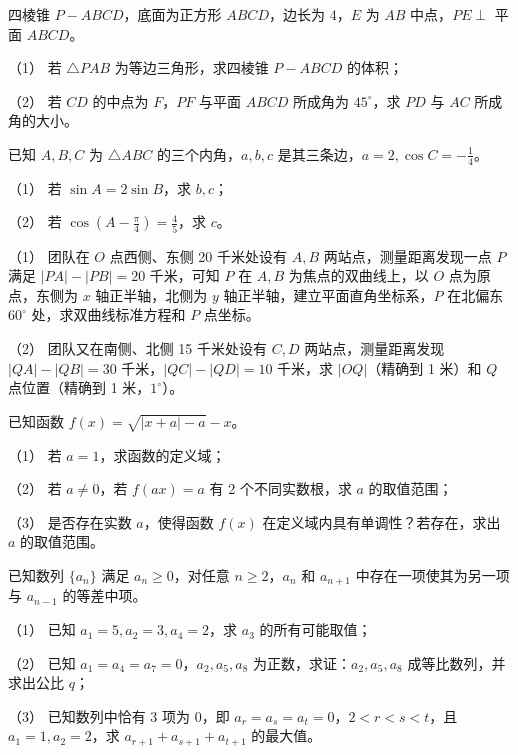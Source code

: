 \Needspace{0.4\textheight}
\begin{question}
四棱锥 $P-ABCD$，底面为正方形 $ABCD$，边长为 4，$E$ 为 $AB$ 中点，$PE\perp$ 平面 $ABCD$。

（1） 若 $\triangle PAB$ 为等边三角形，求四棱锥 $P-ABCD$ 的体积；

（2） 若 $CD$ 的中点为 $F$，$PF$ 与平面 $ABCD$ 所成角为 $45^\circ$，求 $PD$ 与 $AC$ 所成角的大小。
\nopagebreak[4]
\begin{center}\end{center}
\nopagebreak[4]
\end{question}
\begin{question}
已知 $A,B,C$ 为 $\triangle ABC$ 的三个内角，$a,b,c$ 是其三条边，$a=2,\cos C=-\frac14$。

（1） 若 $\sin A=2\sin B$，求 $b,c$；

（2） 若 $\cos(A-\frac\pi4)=\frac45$，求 $c$。
\end{question}
\begin{question}

（1） 团队在 $O$ 点西侧、东侧 20 千米处设有 $A,B$ 两站点，测量距离发现一点 $P$ 满足 $|PA|-|PB|=20$ 千米，可知 $P$ 在 $A,B$ 为焦点的双曲线上，以 $O$ 点为原点，东侧为 $x$ 轴正半轴，北侧为 $y$ 轴正半轴，建立平面直角坐标系，$P$ 在北偏东 $60^\circ$ 处，求双曲线标准方程和 $P$ 点坐标。

（2） 团队又在南侧、北侧 15 千米处设有 $C,D$ 两站点，测量距离发现 $|QA|-|QB|=30$ 千米，$|QC|-|QD|=10$ 千米，求 $|OQ|$（精确到 1 米）和 $Q$ 点位置（精确到 1 米，$1^\circ$）。
\end{question}
\begin{question}
已知函数 $f(x)=\sqrt{|x+a|-a}-x$。

（1） 若 $a=1$，求函数的定义域；

（2） 若 $a\ne0$，若 $f(ax)=a$ 有 2 个不同实数根，求 $a$ 的取值范围；

（3） 是否存在实数 $a$，使得函数 $f(x)$ 在定义域内具有单调性？若存在，求出 $a$ 的取值范围。
\end{question}
\begin{question}
已知数列 $\{a_n\}$ 满足 $a_n\ge0$，对任意 $n\ge2$，$a_n$ 和 $a_{n+1}$ 中存在一项使其为另一项与 $a_{n-1}$ 的等差中项。

（1） 已知 $a_1=5,a_2=3,a_4=2$，求 $a_3$ 的所有可能取值；

（2） 已知 $a_1=a_4=a_7=0$，$a_2,a_5,a_8$ 为正数，求证：$a_2,a_5,a_8$ 成等比数列，并求出公比 $q$；

（3） 已知数列中恰有 3 项为 0，即 $a_r=a_s=a_t=0$，$2<r<s<t$，且 $a_1=1,a_2=2$，求 $a_{r+1}+a_{s+1}+a_{t+1}$ 的最大值。

\end{question}